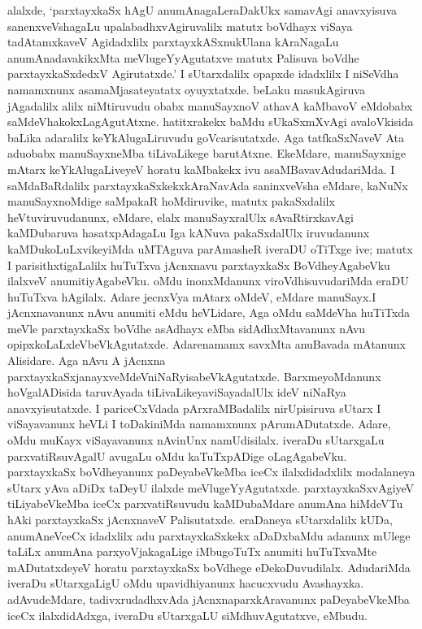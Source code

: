 alalxde, `parxtayxkaSx hAgU anumAnagaLeraDakUkx samavAgi anavxyisuva sanenxveVshagaLu upalabadhxvAgiruvalilx matutx boVdhayx viSaya tadAtamxkaveV Agidadxlilx parxtayxkASxnu\-kUlana kAraNagaLu anumAnadavakikxMta meVlugeYyAgutatxve matutx Palisuva boVdhe \hbox{parxtayxkaSxdedxV} Agirutatxde.' I sUtarxdalilx opapxde idadxlilx I niSeVdha namamxnunx asamaMjasateyatatx oyuyxtatxde. beLaku masukAgiruva jAgadalilx alilx niMtiruvudu obabx manuSayxnoV athavA kaMbavoV eMdobabx saMdeVhakokxLagAgutAtxne. hatitxrakekx baMdu sUkaSxmXvAgi ava\-loVki\-sida baLika adaralilx keYkAlugaLiruvudu goVcarisutatxde. Aga tatfkaSxNaveV Ata adu\break obabx manuSayxneMba tiLivaLikege barutAtxne. EkeMdare, manuSayxnige mAtarx keYkAlu\-gaLi\-veyeV horatu kaMbakekx ivu asaMBavavAdudariMda. I saMdaBaRdalilx parxtayxkaSxkekx\break kAraNa\-vAda saninxveVsha eMdare, kaNuNx manuSayxnoMdige saMpakaR hoMdiruvike, matutx pakaSxdalilx heVtuviruvudanunx, eMdare, elalx manuSayxralUlx sAvaRtirxkavAgi kaMDubaruva hasatxpAdagaLu Iga kANuva pakaSxdalUlx iruvudanunx kaMDukoLuLxvikeyiMda uMTAguva parAmasheR iveraDU oTiTxge ive; matutx I parisithxtigaLalilx huTuTxva jAcnxnavu parxtayxkaSx BoVdheyAgabeVku ilalxveV anumitiyAgabeVku. oMdu inonxMdanunx viroVdhisu\-vudariMda eraDU huTuTxva hAgilalx. Adare jecnxVya mAtarx oMdeV, eMdare manuSayx.\break I jAcnxnavanunx nAvu anumiti eMdu heVLidare, Aga oMdu saMdeVha huTiTxda meVle parxtayxkaSx boVdhe asAdhayx eMba sidAdhxMtavanunx nAvu opipxkoLaLxleVbeVkAgutatxde. Adare\break namamx savxMta anuBavada mAtanunx Alisidare. Aga nAvu A jAcnxna parxtayxkaSxjanayxveMdeV\break niNaRyisabeVkAgutatxde. BarxmeyoMdanunx hoVgalADisida taruvAyada tiLivaLikeya\break viSayadalUlx ideV niNaRya anavxyisutatxde. I pariceCxVdada pArxraMBadalilx nirUpi\-siruva sUtarx I viSayavanunx heVLi I toDakiniMda namamxnunx pArumADutatxde. Adare, oMdu muKayx viSayavanunx nAvinUnx namUdisilalx. iveraDu sUtarxgaLu parxvatiRsu\-vAgalU avugaLu oMdu kaTuTxpADige oLagAgabeVku. parxtayxkaSx boVdheyanunx paDeya\-beVkeMba iceCx ilalxdidadxlilx modalaneya sUtarx yAva aDiDx taDeyU ilalxde meVlugeY\-yAgutatxde. parxtayxkaSxvAgiyeV tiLiyabeVkeMba iceCx parxvatiRsuvudu kaMDubaMdare anu\-mAna hiMdeVTu hAki parxtayxkaSx jAcnxnaveV Palisutatxde. eraDaneya sUtarxdalilx kUDa, anu\-mAneVceCx idadxlilx adu parxtayxkaSxkekx aDaDxbaMdu adanunx mUlege taLiLx anumAna parxyoVjaka\-gaLige iMbugoTuTx anumiti huTuTxvaMte mADutatxdeyeV horatu parxtayxkaSx \hbox{boVdhege} eDekoDuvudilalx. AdudariMda iveraDu sUtarxgaLigU oMdu upavidhiyanunx hacucx\-vudu Avashayxka. adAvudeMdare, tadivxrudadhxvAda jAcnxnaparxkAravanunx paDeyabeVkeMba iceCx ilalxdidAdxga, iveraDu sUtarxgaLU siMdhuvAgutatxve, eMbudu.

